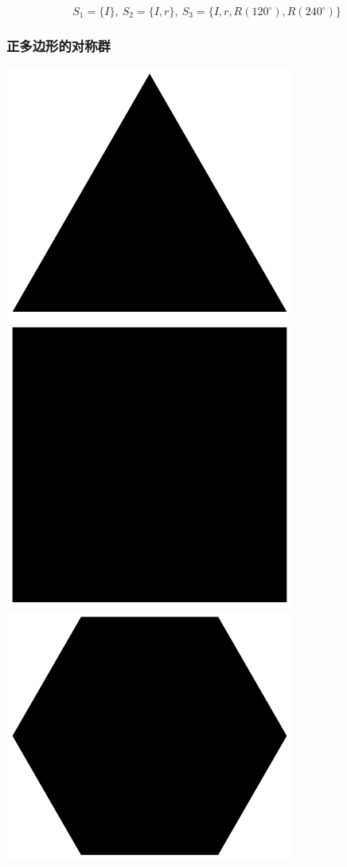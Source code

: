 \documentclass[CJK]{beamer}
\begin{document}
\begin{frame}
\begin{center}
\end{center}
$$S_1 = \{I\},\ S_2 = \{I,r\},\ S_3 =\{I,r,R(120^\circ),R(240^\circ)\}$$

\ech
\end{frame}

\begin{frame}
\frametitle{\bch 正多边形的对称群 \ech}
\bch

\begin{center}
\includegraphics[scale=0.15]{rtri}
\includegraphics[scale=0.15]{pol4}
\includegraphics[scale=0.15]{pol6}

\end{center}
\end{frame}
\end{document}
